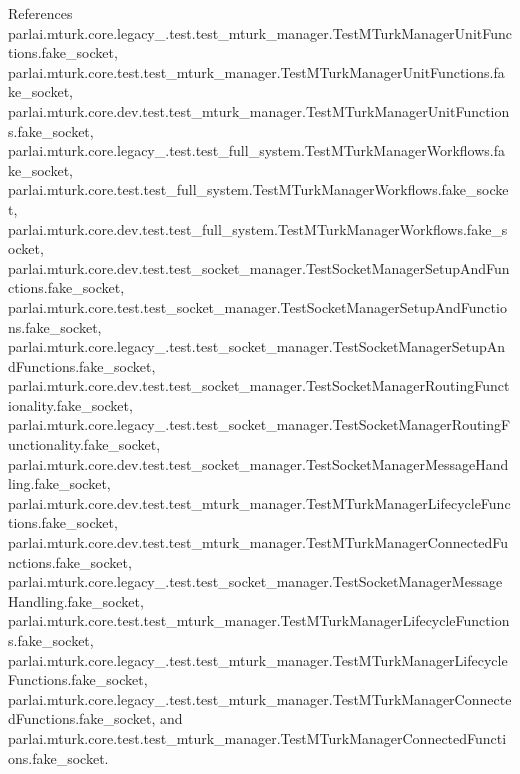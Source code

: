 References parlai.\+mturk.\+core.\+legacy\+\_.\+test.\+test\+\_\+mturk\+\_\+manager.\+Test\+M\+Turk\+Manager\+Unit\+Functions.\+fake\+\_\+socket, parlai.\+mturk.\+core.\+test.\+test\+\_\+mturk\+\_\+manager.\+Test\+M\+Turk\+Manager\+Unit\+Functions.\+fake\+\_\+socket, parlai.\+mturk.\+core.\+dev.\+test.\+test\+\_\+mturk\+\_\+manager.\+Test\+M\+Turk\+Manager\+Unit\+Functions.\+fake\+\_\+socket, parlai.\+mturk.\+core.\+legacy\+\_.\+test.\+test\+\_\+full\+\_\+system.\+Test\+M\+Turk\+Manager\+Workflows.\+fake\+\_\+socket, parlai.\+mturk.\+core.\+test.\+test\+\_\+full\+\_\+system.\+Test\+M\+Turk\+Manager\+Workflows.\+fake\+\_\+socket, parlai.\+mturk.\+core.\+dev.\+test.\+test\+\_\+full\+\_\+system.\+Test\+M\+Turk\+Manager\+Workflows.\+fake\+\_\+socket, parlai.\+mturk.\+core.\+dev.\+test.\+test\+\_\+socket\+\_\+manager.\+Test\+Socket\+Manager\+Setup\+And\+Functions.\+fake\+\_\+socket, parlai.\+mturk.\+core.\+test.\+test\+\_\+socket\+\_\+manager.\+Test\+Socket\+Manager\+Setup\+And\+Functions.\+fake\+\_\+socket, parlai.\+mturk.\+core.\+legacy\+\_.\+test.\+test\+\_\+socket\+\_\+manager.\+Test\+Socket\+Manager\+Setup\+And\+Functions.\+fake\+\_\+socket, parlai.\+mturk.\+core.\+dev.\+test.\+test\+\_\+socket\+\_\+manager.\+Test\+Socket\+Manager\+Routing\+Functionality.\+fake\+\_\+socket, parlai.\+mturk.\+core.\+legacy\+\_.\+test.\+test\+\_\+socket\+\_\+manager.\+Test\+Socket\+Manager\+Routing\+Functionality.\+fake\+\_\+socket, parlai.\+mturk.\+core.\+dev.\+test.\+test\+\_\+socket\+\_\+manager.\+Test\+Socket\+Manager\+Message\+Handling.\+fake\+\_\+socket, parlai.\+mturk.\+core.\+dev.\+test.\+test\+\_\+mturk\+\_\+manager.\+Test\+M\+Turk\+Manager\+Lifecycle\+Functions.\+fake\+\_\+socket, parlai.\+mturk.\+core.\+dev.\+test.\+test\+\_\+mturk\+\_\+manager.\+Test\+M\+Turk\+Manager\+Connected\+Functions.\+fake\+\_\+socket, parlai.\+mturk.\+core.\+legacy\+\_.\+test.\+test\+\_\+socket\+\_\+manager.\+Test\+Socket\+Manager\+Message\+Handling.\+fake\+\_\+socket, parlai.\+mturk.\+core.\+test.\+test\+\_\+mturk\+\_\+manager.\+Test\+M\+Turk\+Manager\+Lifecycle\+Functions.\+fake\+\_\+socket, parlai.\+mturk.\+core.\+legacy\+\_.\+test.\+test\+\_\+mturk\+\_\+manager.\+Test\+M\+Turk\+Manager\+Lifecycle\+Functions.\+fake\+\_\+socket, parlai.\+mturk.\+core.\+legacy\+\_.\+test.\+test\+\_\+mturk\+\_\+manager.\+Test\+M\+Turk\+Manager\+Connected\+Functions.\+fake\+\_\+socket, and parlai.\+mturk.\+core.\+test.\+test\+\_\+mturk\+\_\+manager.\+Test\+M\+Turk\+Manager\+Connected\+Functions.\+fake\+\_\+socket.

